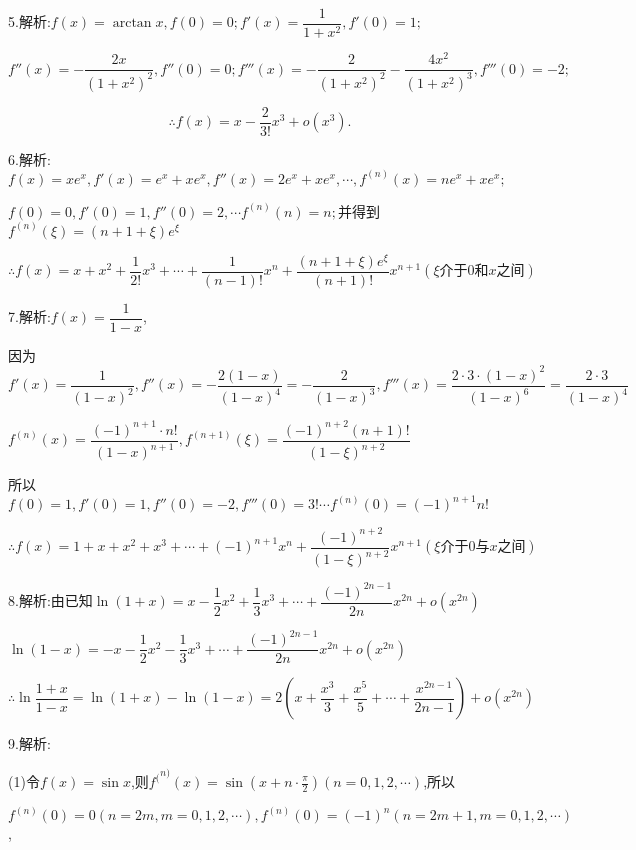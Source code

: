 5.解析:$f(x) = \arctan x,f(0) = 0;f'(x) = \dfrac{1}{{1 + {x^2}}},f'(0) = 1;$

$f''(x) =  - \dfrac{{2x}}{{{{(1 + {x^2})}^2}}},f''(0) = 0;f'''(x) =  - \dfrac{2}{{{{(1 + {x^2})}^2}}} - \dfrac{{4{x^2}}}{{{{(1 + {x^2})}^3}}},f'''(0) =  - 2;$

\[\therefore f(x) = x - \frac{2}{{3!}}{x^3} + o({x^3}).\]

6.解析:$f(x) = x{e^x},f'(x) = {e^x} + x{e^x},f''(x) = 2{e^x} + x{e^x}, \cdots ,{f^{(n)}}(x) = n{e^x} + x{e^x};$

$f(0) = 0,f'(0) = 1,f''(0) = 2, \cdots {f^{(n)}}(n) = n;$并得到${f^{(n)}}(\xi ) = (n + 1 + \xi ){e^\xi }$

\[\therefore f(x) = x + {x^2} + \frac{1}{{2!}}{x^3} +  \cdots  + \frac{1}{{(n - 1)!}}{x^n} + \frac{{(n + 1 + \xi ){e^\xi }}}{{(n + 1)!}}{x^{n + 1}}(\xi 介于 0和x之间)\]

7.解析:$f(x) = \dfrac{1}{{1 - x}}$,

因为$f'(x) = \dfrac{1}{{{{(1 - x)}^2}}},f''(x) =  - \dfrac{{2(1 - x)}}{{{{(1 - x)}^4}}} =  - \dfrac{2}{{{{(1 - x)}^3}}},f'''(x) = \dfrac{{2 \cdot 3 \cdot {{(1 - x)}^2}}}{{{{(1 - x)}^6}}} = \dfrac{{2 \cdot 3}}{{{{(1 - x)}^4}}}$

${f^{(n)}}(x) = \dfrac{{{{( - 1)}^{n + 1}} \cdot n!}}{{{{(1 - x)}^{n + 1}}}},{f^{(n + 1)}}(\xi ) = \dfrac{{{{( - 1)}^{n + 2}}(n + 1)!}}{{{{(1 - \xi )}^{n + 2}}}}$

所以$f(0) = 1,f'(0) = 1,f''(0) =  - 2,f'''(0) = 3! \cdots {f^{(n)}}(0) = {( - 1)^{n + 1}}n!$

\[\therefore f(x) = 1 + x + {x^2} + {x^3} +  \cdots  + {( - 1)^{n + 1}}{x^n} + \dfrac{{{{( - 1)}^{n + 2}}}}{{{{(1 - \xi )}^{n + 2}}}}{x^{n + 1}} (\xi 介于0与x之间)\]

8.解析:由已知$\ln (1 + x) = x - \dfrac{1}{2}{x^2} + \dfrac{1}{3}{x^3} +  \cdots  + \dfrac{{{{( - 1)}^{2n - 1}}}}{{2n}}{x^{2n}} + o({x^{2n}})$

$\ln (1 - x) =  - x - \dfrac{1}{2}{x^2} - \dfrac{1}{3}{x^3} +  \cdots  + \dfrac{{{{( - 1)}^{2n - 1}}}}{{2n}}{x^{2n}} + o({x^{2n}})$

\[\therefore \ln \dfrac{{1 + x}}{{1 - x}} = \ln (1 + x) - \ln (1 - x) = 2(x + \dfrac{{{x^3}}}{3} + \dfrac{{{x^5}}}{5} +  \cdots  + \dfrac{{{x^{2n - 1}}}}{{2n - 1}}) + o({x^{2n}})\]

9.解析:

(1)令$f(x) = \sin x$,则${f^(}^{n)}(x) = \sin (x + n \cdot \frac{\pi }{2})(n = 0,1,2, \cdots )$,所以

${f^{(n)}}(0) = 0(n = 2m,m = 0,1,2, \cdots ),{f^{(n)}}(0) = {( - 1)^n}(n = 2m + 1,m = 0,1,2, \cdots )$,

